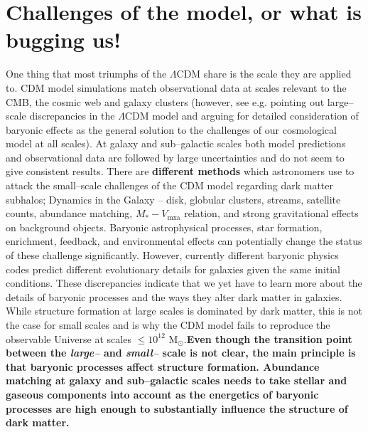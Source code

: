 \documentclass[a4wide,12pt]{book}
\newcommand{\msun }{$\mathrm{M}_{\odot}$}
\begin{document}
{\section{Challenges of the model, or what is bugging us!}
\label{subsec:LCDM_challenges}
One thing that most triumphs of the $\Lambda$CDM share is the scale they are applied to. CDM model simulations match observational data at scales relevant to the CMB, the cosmic web and galaxy clusters (however, see e.g. \citet{Guo+2011} pointing out large--scale discrepancies in the $\Lambda$CDM model and arguing for detailed consideration of baryonic effects as the general solution to the challenges of our cosmological model at all scales). At galaxy and sub--galactic scales both model predictions and observational data are followed by large uncertainties and do not seem to give consistent results. There are {\bf different methods} which astronomers use to attack the small--scale challenges of the CDM model regarding dark matter subhalos; Dynamics in the Galaxy -- disk, globular clusters, streams, satellite counts, abundance matching, $M_* - V_\mathrm{mxa}$ relation, and strong gravitational effects on background objects. Baryonic astrophysical processes, star formation, enrichment, feedback, and environmental effects can potentially change the status of these challenge significantly. However, currently different baryonic physics codes predict different evolutionary details for galaxies given the same initial conditions. These discrepancies indicate that we yet have to learn more about the details of baryonic processes and the ways they alter dark matter in galaxies. While structure formation at large scales is dominated by dark matter, this is not the case for small scales and is why the CDM model fails to reproduce the observable Universe at scales $\leq 10^{12} $ \msun .{\bf Even though the transition point between the \emph{large--} and \emph{small--} scale is not clear, the main principle is that baryonic processes affect structure formation.  Abundance matching at galaxy and sub--galactic scales needs to take stellar and gaseous components into account as the energetics of baryonic processes are high enough to substantially influence the structure of dark matter.}

}
\end{document}
